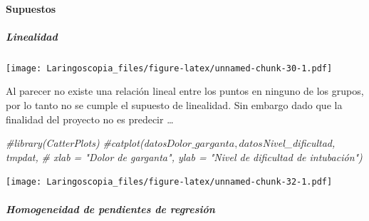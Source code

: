 \documentclass[
]{article}
\newenvironment{Shaded}{\begin{snugshade}}{\end{snugshade}}
\newcommand{\AttributeTok}[1]{\textcolor[rgb]{0.13,0.29,0.53}{#1}}
\newcommand{\CommentTok}[1]{\textcolor[rgb]{0.56,0.35,0.01}{\textit{#1}}}
\newcommand{\FunctionTok}[1]{\textcolor[rgb]{0.13,0.29,0.53}{\textbf{#1}}}
\newcommand{\NormalTok}[1]{#1}
\newcommand{\OtherTok}[1]{\textcolor[rgb]{0.56,0.35,0.01}{#1}}
\newcommand{\SpecialCharTok}[1]{\textcolor[rgb]{0.81,0.36,0.00}{\textbf{#1}}}
\begin{document}
\hypertarget{supuestos}{%
\paragraph{Supuestos}\label{supuestos}}

\hypertarget{linealidad}{%
\subparagraph{Linealidad}\label{linealidad}}

\begin{Shaded}
\end{Shaded}

\texttt{[image: Laringoscopia\_files/figure-latex/unnamed-chunk-30-1.pdf]}

Al parecer no existe una relación lineal entre los puntos en ninguno de
los grupos, por lo tanto no se cumple el supuesto de linealidad. Sin
embargo dado que la finalidad del proyecto no es predecir \ldots{}

\begin{Shaded}
\begin{Highlighting}[]
\CommentTok{\#library(CatterPlots)}
\CommentTok{\#catplot(datos$Dolor\_garganta, datos$Nivel\_dificultad, tmpdat,}
\CommentTok{\#         xlab = "Dolor de garganta", ylab = "Nivel de dificultad de intubación")}
\end{Highlighting}
\end{Shaded}

\begin{Shaded}
\end{Shaded}

\texttt{[image: Laringoscopia\_files/figure-latex/unnamed-chunk-32-1.pdf]}

\hypertarget{homogeneidad-de-pendientes-de-regresiuxf3n}{%
\subparagraph{Homogeneidad de pendientes de
regresión}\label{homogeneidad-de-pendientes-de-regresiuxf3n}}
\end{document}

